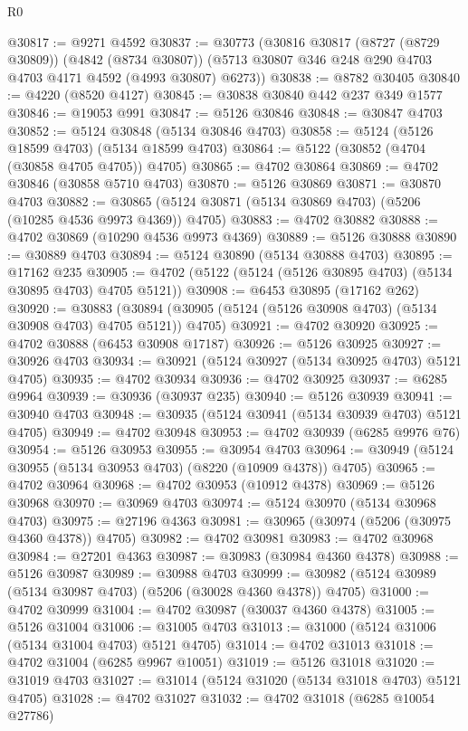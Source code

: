 \begin{lexlean}{R0}
\begin{coremodule}
@30817 := @9271 @4592
@30837 := @30773
    (@30816
      @30817
      (@8727 (@8729 @30809))
      (@4842 (@8734 @30807))
      (@5713 @30807 @346 @248 @290 @4703 @4703 @4171 @4592 (@4993 @30807) @6273))
@30838 := @8782 @30405
@30840 := @4220 (@8520 @4127)
@30845 := @30838 @30840 @442 @237 @349 @1577
@30846 := @19053 @991
@30847 := @5126 @30846
@30848 := @30847 @4703
@30852 := @5124 @30848 (@5134 @30846 @4703)
@30858 := @5124 (@5126 @18599 @4703) (@5134 @18599 @4703)
@30864 := @5122 (@30852 (@4704 (@30858 @4705 @4705)) @4705)
@30865 := @4702 @30864
@30869 := @4702 @30846 (@30858 @5710 @4703)
@30870 := @5126 @30869
@30871 := @30870 @4703
@30882 := @30865 (@5124 @30871 (@5134 @30869 @4703) (@5206 (@10285 @4536 @9973 @4369)) @4705)
@30883 := @4702 @30882
@30888 := @4702 @30869 (@10290 @4536 @9973 @4369)
@30889 := @5126 @30888
@30890 := @30889 @4703
@30894 := @5124 @30890 (@5134 @30888 @4703)
@30895 := @17162 @235
@30905 := @4702 (@5122 (@5124 (@5126 @30895 @4703) (@5134 @30895 @4703) @4705 @5121))
@30908 := @6453 @30895 (@17162 @262)
@30920 := @30883
    (@30894 (@30905 (@5124 (@5126 @30908 @4703) (@5134 @30908 @4703) @4705 @5121)) @4705)
@30921 := @4702 @30920
@30925 := @4702 @30888 (@6453 @30908 @17187)
@30926 := @5126 @30925
@30927 := @30926 @4703
@30934 := @30921 (@5124 @30927 (@5134 @30925 @4703) @5121 @4705)
@30935 := @4702 @30934
@30936 := @4702 @30925
@30937 := @6285 @9964
@30939 := @30936 (@30937 @235)
@30940 := @5126 @30939
@30941 := @30940 @4703
@30948 := @30935 (@5124 @30941 (@5134 @30939 @4703) @5121 @4705)
@30949 := @4702 @30948
@30953 := @4702 @30939 (@6285 @9976 @76)
@30954 := @5126 @30953
@30955 := @30954 @4703
@30964 := @30949 (@5124 @30955 (@5134 @30953 @4703) (@8220 (@10909 @4378)) @4705)
@30965 := @4702 @30964
@30968 := @4702 @30953 (@10912 @4378)
@30969 := @5126 @30968
@30970 := @30969 @4703
@30974 := @5124 @30970 (@5134 @30968 @4703)
@30975 := @27196 @4363
@30981 := @30965 (@30974 (@5206 (@30975 @4360 @4378)) @4705)
@30982 := @4702 @30981
@30983 := @4702 @30968
@30984 := @27201 @4363
@30987 := @30983 (@30984 @4360 @4378)
@30988 := @5126 @30987
@30989 := @30988 @4703
@30999 := @30982 (@5124 @30989 (@5134 @30987 @4703) (@5206 (@30028 @4360 @4378)) @4705)
@31000 := @4702 @30999
@31004 := @4702 @30987 (@30037 @4360 @4378)
@31005 := @5126 @31004
@31006 := @31005 @4703
@31013 := @31000 (@5124 @31006 (@5134 @31004 @4703) @5121 @4705)
@31014 := @4702 @31013
@31018 := @4702 @31004 (@6285 @9967 @10051)
@31019 := @5126 @31018
@31020 := @31019 @4703
@31027 := @31014 (@5124 @31020 (@5134 @31018 @4703) @5121 @4705)
@31028 := @4702 @31027
@31032 := @4702 @31018 (@6285 @10054 @27786)

\end{coremodule}
\end{lexlean}

